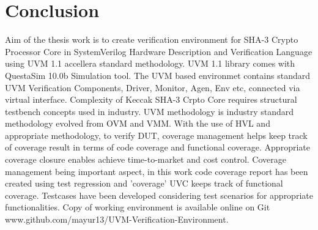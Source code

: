 \chapter*{Conclusion}

Aim of the thesis work is to create verification environment for SHA-3 Crypto Processor Core in SystemVerilog Hardware Description and Verification Language using UVM 1.1 accellera standard methodology. UVM 1.1 library comes with QuestaSim 10.0b Simulation tool. The UVM based environmet contains standard UVM Verification Components, Driver, Monitor, Agen, Env etc, connected via virtual interface. Complexity of Keccak SHA-3 Crpto Core requires structural testbench concepts used in industry. UVM methodology is industry standard methodology evolved from OVM and VMM. With the use of HVL and appropriate methodology, to verify DUT, coverage management helps keep track of coverage result in terms of code coverage and functional coverage. Appropriate coverage closure enables achieve time-to-market and cost control. Coverage management being important aspect, in this work code coverage report has been created using test regression and 'coverage' UVC keeps track of functional coverage. Testcases have been developed considering test scenarios for appropriate functionalities. Copy of working environment is available online on Git www.github.com/mayur13/UVM-Verification-Environment.